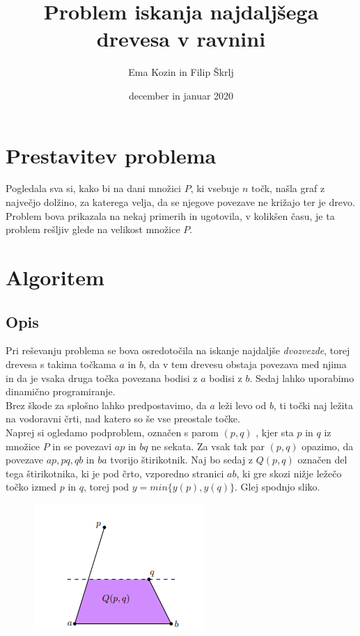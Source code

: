 \documentclass[a4paper,12pt]{article}
\title{Problem iskanja najdaljšega drevesa v ravnini}
\author{Ema Kozin in Filip Škrlj}
\date{december in januar 2020}
\begin{document}
	
\maketitle
	
\newpage
\section{Prestavitev problema}

Pogledala sva si, kako bi na dani množici $P$, ki vsebuje $n$ točk, našla graf z največjo dolžino, za katerega velja, da se njegove povezave ne križajo ter je drevo.
 Problem bova prikazala na nekaj primerih in ugotovila, v kolikšen času, je ta problem rešljiv glede na velikost množice $P$. 


\section{Algoritem}

\subsection{Opis}
Pri reševanju problema se bova osredotočila na iskanje najdaljše \emph{dvozvezde}, torej drevesa s takima točkama $a$ in $b$,
 da v tem drevesu obstaja povezava med njima
in da je vsaka druga točka povezana bodisi z $a$ bodisi z $b$. Sedaj lahko uporabimo dinamično programiranje. \\
Brez škode za splošno lahko predpostavimo, da $a$ leži levo od $b$, ti točki naj ležita na vodoravni črti, nad katero so še vse preostale točke. \\
Naprej si ogledamo podproblem, označen s parom $(p, q)$ , kjer sta $p$ in $q$ iz množice $P$ in se povezavi $ap$ in $bq$ ne sekata.
 Za vsak tak par $(p, q)$ opazimo, da povezave $ap, pq, qb$ in $ba$ tvorijo štirikotnik. Naj bo sedaj z $Q(p,q)$ označen del tega štirikotnika, ki je pod črto,
  vzporedno stranici $ab$, ki gre skozi nižje ležečo točko izmed $p$ in $q$, torej pod $y = min\{y(p),y(q)\}$. Glej spodnjo sliko.\\
  
\begin{figure}[h]
	\centering
	\includegraphics{primer_Q(p,q).png}
\end{figure}
\end{document}
